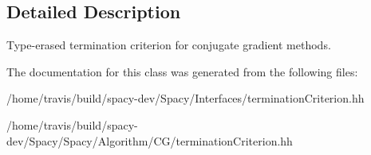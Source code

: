 \subsection{\-Detailed \-Description}
\-Type-\/erased termination criterion for conjugate gradient methods. 

\-The documentation for this class was generated from the following files\-:\begin{DoxyCompactItemize}
\item 
/home/travis/build/spacy-\/dev/\-Spacy/\-Interfaces/termination\-Criterion.\-hh\item 
/home/travis/build/spacy-\/dev/\-Spacy/\-Spacy/\-Algorithm/\-C\-G/termination\-Criterion.\-hh\end{DoxyCompactItemize}
